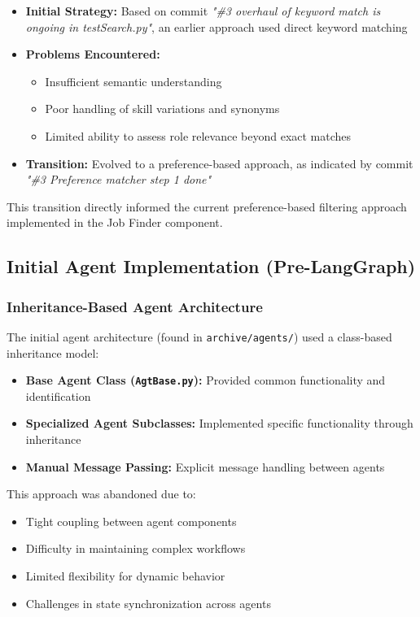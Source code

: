 \documentclass[a4paper,12pt]{article}
\begin{document}
\begin{itemize}
    \item \textbf{Initial Strategy:} Based on commit \textit{"\#3 overhaul of keyword match is ongoing in testSearch.py"}, an earlier approach used direct keyword matching
    \item \textbf{Problems Encountered:} 
    \begin{itemize}
        \item Insufficient semantic understanding 
        \item Poor handling of skill variations and synonyms
        \item Limited ability to assess role relevance beyond exact matches
    \end{itemize}
    \item \textbf{Transition:} Evolved to a preference-based approach, as indicated by commit \textit{"\#3 Preference matcher step 1 done"}
\end{itemize}

This transition directly informed the current preference-based filtering approach implemented in the Job Finder component.

\subsection{Initial Agent Implementation (Pre-LangGraph)}

\subsubsection{Inheritance-Based Agent Architecture}
The initial agent architecture (found in \texttt{archive/agents/}) used a class-based inheritance model:

\begin{itemize}
    \item \textbf{Base Agent Class (\texttt{AgtBase.py}):} Provided common functionality and identification
    \item \textbf{Specialized Agent Subclasses:} Implemented specific functionality through inheritance
    \item \textbf{Manual Message Passing:} Explicit message handling between agents
\end{itemize}

This approach was abandoned due to:
\begin{itemize}
    \item Tight coupling between agent components
    \item Difficulty in maintaining complex workflows
    \item Limited flexibility for dynamic behavior
    \item Challenges in state synchronization across agents
\end{itemize}
\end{document}
